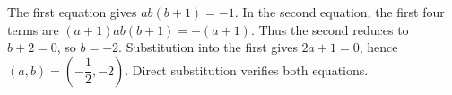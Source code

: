The first equation gives $ab(b+1)=-1$. In the second equation, the first four terms are $(a+1)ab(b+1)=-(a+1)$. Thus the second reduces to $b+2=0$, so $b=-2$. Substitution into the first gives $2a+1=0$, hence $\boxed{(a,b)=(-\dfrac{1}{2},-2)}$. Direct substitution verifies both equations.
